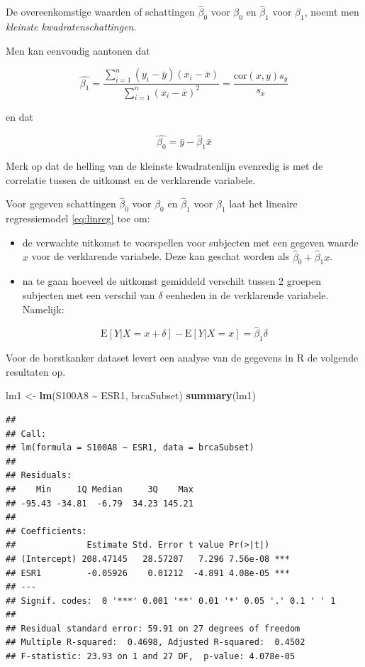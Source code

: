 \documentclass[
  12pt,dutch]{book}
\newenvironment{Shaded}{\begin{snugshade}}{\end{snugshade}}
\newcommand{\FunctionTok}[1]{\textcolor[rgb]{0.13,0.29,0.53}{\textbf{#1}}}
\newcommand{\NormalTok}[1]{#1}
\newcommand{\OtherTok}[1]{\textcolor[rgb]{0.56,0.35,0.01}{#1}}
\newcommand{\SpecialCharTok}[1]{\textcolor[rgb]{0.81,0.36,0.00}{\textbf{#1}}}
\providecommand{\tightlist}{%
  \setlength{\itemsep}{0pt}\setlength{\parskip}{0pt}}
\theoremstyle{definition}
\theoremstyle{definition}
\theoremstyle{definition}
\theoremstyle{definition}
\theoremstyle{remark}
\begin{document}
De overeenkomstige waarden of schattingen \(\hat{\beta}_0\) voor \(\beta_0\) en \(\hat{\beta}_1\) voor \(\beta_1\), noemt men \emph{kleinste kwadratenschattingen}.

Men kan eenvoudig aantonen dat

\[\hat{\beta_1}= \frac{\sum\limits_{i=1}^n (y_i-\bar y)(x_i-\bar x)}{\sum\limits_{i=1}^n (x_i-\bar x)^2}=\frac{\mbox{cor}(x,y)s_y}{s_x} \]

en dat

\[\hat{\beta_0}=\bar y - \hat{\beta}_1 \bar x \]

Merk op dat de helling van de kleinste kwadratenlijn evenredig is met de correlatie tussen de uitkomst en de verklarende variabele.

Voor gegeven schattingen \(\hat{\beta}_0\) voor \(\beta_0\) en \(\hat{\beta}_1\) voor \(\beta_1\) laat het lineaire regressiemodel \eqref{eq:linreg} toe om:

\begin{itemize}
\tightlist
\item
  de verwachte uitkomst te voorspellen voor subjecten met een gegeven
  waarde \(x\) voor de verklarende variabele. Deze kan geschat worden als \(\hat{\beta}_0+\hat{\beta}_1x\).
\item
  na te gaan hoeveel de uitkomst gemiddeld verschilt tussen 2 groepen subjecten met een verschil van \(\delta\) eenheden in de verklarende variabele. Namelijk:
\end{itemize}

\[\text{E}\left[Y|X=x+\delta\right]-\text{E}\left[Y|X=x\right]= \hat{\beta}_1\delta\]

Voor de borstkanker dataset levert een analyse van de gegevens in R de volgende resultaten op.

\begin{Shaded}
\begin{Highlighting}[]
\NormalTok{lm1 }\OtherTok{\textless{}{-}} \FunctionTok{lm}\NormalTok{(S100A8 }\SpecialCharTok{\textasciitilde{}}\NormalTok{ ESR1, brcaSubset)}
\FunctionTok{summary}\NormalTok{(lm1)}
\end{Highlighting}
\end{Shaded}

\begin{verbatim}
## 
## Call:
## lm(formula = S100A8 ~ ESR1, data = brcaSubset)
## 
## Residuals:
##    Min     1Q Median     3Q    Max 
## -95.43 -34.81  -6.79  34.23 145.21 
## 
## Coefficients:
##              Estimate Std. Error t value Pr(>|t|)    
## (Intercept) 208.47145   28.57207   7.296 7.56e-08 ***
## ESR1         -0.05926    0.01212  -4.891 4.08e-05 ***
## ---
## Signif. codes:  0 '***' 0.001 '**' 0.01 '*' 0.05 '.' 0.1 ' ' 1
## 
## Residual standard error: 59.91 on 27 degrees of freedom
## Multiple R-squared:  0.4698, Adjusted R-squared:  0.4502 
## F-statistic: 23.93 on 1 and 27 DF,  p-value: 4.078e-05
\end{verbatim}
\end{document}

